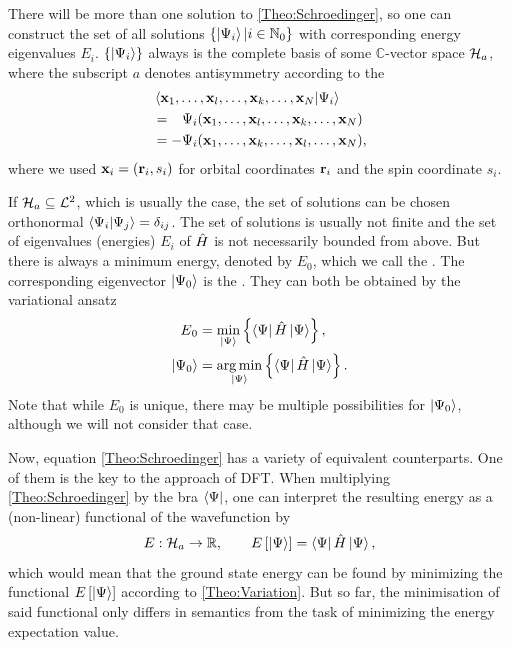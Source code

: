 \documentclass[8.5pt,twoside,twocolumn]{article}
\renewcommand\Hil{\enmat{\mathcal H_a}}
\renewcommand\r{\bo r}
\theoremstyle{standard}
\begin{document}
There will be more than one solution to \eqref{Theo:Schroedinger}, so one can construct the set of all solutions $\left\{{\left|\Psi{_i}\right\rangle | i \in \mathbb{N}_0} \right\}$
with corresponding energy eigenvalues $E_i$. $\left\{{\left|\Psi{_i}\right\rangle} \right\}$ always is the complete basis of
some $\mathbb C$-vector space $\Hil$, where the subscript $a$ denotes antisymmetry according 
to the 
\begin{equation}
\begin{aligned}
 &\bkt{\x_1,\ldots,\x_l,\ldots,\x_k,\ldots,\x_N | \Psi_i } \\
 &=\ph - \Psi_i(\x_1,\ldots,\x_l,\ldots,\x_k,\ldots,\x_N) \\
 &= - \Psi_i(\x_1,\ldots,\x_k,\ldots,\x_l,\ldots,\x_N),
\end{aligned}
\label{Theo:Pauli}
\end{equation}
where we used $\x_i=(\r_i,s_i)$ for orbital coordinates $\r_i$ and the spin coordinate $s_i$.

 If $\Hil \suseq \mathcal {L}^2$, which is usually the case,
the set of solutions can be chosen orthonormal $\left\langle{\Psi_i | \Psi_j}\right\rangle = \delta_{ij}$.
The set of solutions is usually not finite and the set of eigenvalues (energies) $E_i$ of $\hat{H}$
is not necessarily bounded from above. But there is always a minimum energy, denoted by $E_0$, 
which we call the . The corresponding eigenvector 
$\left|\Psi{_0}\right\rangle$ is the . They can both be obtained by the
variational ansatz
\begin{equation}
\begin{aligned}
 E{_0}&= \min_{\left|\Psi{}\right\rangle} \left\{{ \left\langle\Psi{}\right| \hat{H} \left|\Psi{}\right\rangle} \right\}, \\
 \left|\Psi{_0}\right\rangle&= \operatorname*{arg\,min}_{\left|\Psi{}\right\rangle} \left\{{ \left\langle\Psi{}\right| \hat{H} \left|\Psi{}\right\rangle} \right\}.
\end{aligned}
\label{Theo:Variation}
\end{equation}
Note that while $E_0$ is unique, there may be multiple possibilities for $\left|\Psi{_0}\right\rangle$, although
we will not consider that case.

Now, equation \eqref{Theo:Schroedinger} has a variety of equivalent counterparts. One of them
is the key to the approach of DFT. When multiplying \eqref{Theo:Schroedinger} by the bra $\left\langle\Psi{}\right|$,
one can interpret the resulting energy as a (non-linear) functional of the wavefunction by
\begin{equation}
 E : \Hil \rar \R, \qquad E\ed{\keP{}}=\brP{} \Ha \keP{},
 \label{Theo:WaveFunctional}
\end{equation}
which would mean that the ground state energy can be found by minimizing the functional
$E\left[{\left|\Psi{}\right\rangle}\right]$ according to \eqref{Theo:Variation}. But so far, the minimisation
of said functional only differs in semantics from the task of minimizing the energy expectation value.
\end{document}
